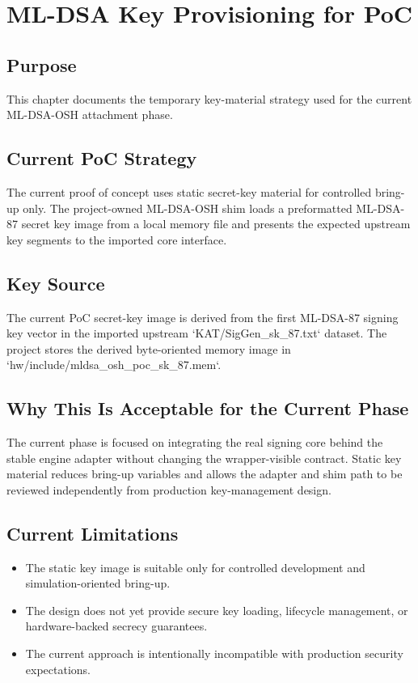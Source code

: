 \chapter{ML-DSA Key Provisioning for PoC}

\section*{Purpose}
This chapter documents the temporary key-material strategy used for the current ML-DSA-OSH attachment phase.

\section{Current PoC Strategy}
The current proof of concept uses static secret-key material for controlled bring-up only. The project-owned ML-DSA-OSH shim loads a preformatted ML-DSA-87 secret key image from a local memory file and presents the expected upstream key segments to the imported core interface.

\section{Key Source}
The current PoC secret-key image is derived from the first ML-DSA-87 signing key vector in the imported upstream `KAT/SigGen\_sk\_87.txt` dataset. The project stores the derived byte-oriented memory image in `hw/include/mldsa\_osh\_poc\_sk\_87.mem`.

\section{Why This Is Acceptable for the Current Phase}
The current phase is focused on integrating the real signing core behind the stable engine adapter without changing the wrapper-visible contract. Static key material reduces bring-up variables and allows the adapter and shim path to be reviewed independently from production key-management design.

\section{Current Limitations}
\begin{itemize}[leftmargin=*]
  \item The static key image is suitable only for controlled development and simulation-oriented bring-up.
  \item The design does not yet provide secure key loading, lifecycle management, or hardware-backed secrecy guarantees.
  \item The current approach is intentionally incompatible with production security expectations.
\end{itemize}

